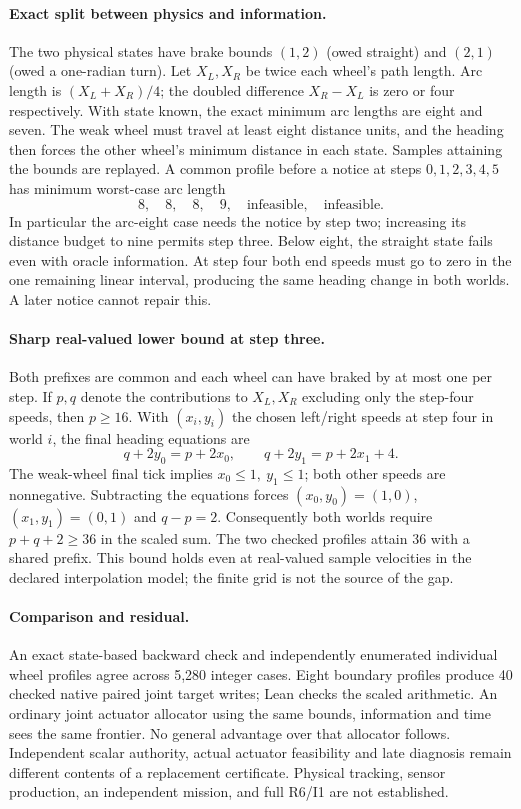 \documentclass{article}
\begin{document}
\paragraph{Exact split between physics and information.}
The two physical states have brake bounds
\((1,2)\) (owed straight) and \((2,1)\) (owed a one-radian turn).
Let \(X_L,X_R\) be twice each wheel's path length. Arc length is
\((X_L+X_R)/4\); the doubled difference \(X_R-X_L\) is zero or four
respectively. With state known, the exact minimum arc lengths are
eight and seven. The weak wheel must travel at least eight
distance units, and the heading then forces the other wheel's
minimum distance in each state. Samples attaining the bounds are
replayed. A common profile before a notice at steps \(0,1,2,3,4,5\)
has minimum worst-case arc length
\[
  8,\quad 8,\quad 8,\quad 9,\quad\text{infeasible},\quad
  \text{infeasible}.
\]
In particular the arc-eight case needs the notice by step two;
increasing its distance budget to nine permits step three.
Below eight, the straight state fails even with oracle information.
At step four both end speeds must go to zero in the one remaining
linear interval, producing the same heading change in both worlds.
A later notice cannot repair this.

\paragraph{Sharp real-valued lower bound at step three.}
Both prefixes are common and each wheel can have braked by at most
one per step. If \(p,q\) denote the contributions to \(X_L,X_R\)
excluding only the step-four speeds, then \(p\ge16\). With
\((x_i,y_i)\) the chosen left/right speeds at step four in world
\(i\), the final heading equations are
\[
 q+2y_0=p+2x_0,\qquad q+2y_1=p+2x_1+4 .
\]
The weak-wheel final tick implies \(x_0\le1,\ y_1\le1\); both
other speeds are nonnegative. Subtracting the equations forces
\((x_0,y_0)=(1,0)\), \((x_1,y_1)=(0,1)\) and \(q-p=2\).
Consequently both worlds require \(p+q+2\ge36\) in the scaled
sum. The two checked profiles attain 36 with a shared prefix.
This bound holds even at real-valued sample velocities in the
declared interpolation model; the finite grid is not the source
of the gap.

\paragraph{Comparison and residual.}
An exact state-based backward check and independently enumerated
individual wheel profiles agree across 5,280 integer cases.
Eight boundary profiles produce 40 checked native paired joint
target writes; Lean checks the scaled arithmetic. An ordinary
joint actuator allocator using the same bounds, information and
time sees the same frontier. No general advantage over that
allocator follows. Independent scalar authority, actual actuator
feasibility and late diagnosis remain different contents of a
replacement certificate. Physical tracking, sensor production,
an independent mission, and full R6/I1 are not established.
\end{document}
